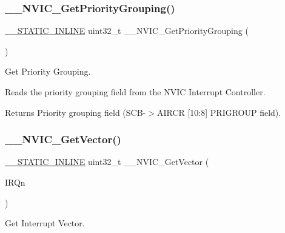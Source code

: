 \subsubsection{\texorpdfstring{\+\_\+\+\_\+\+N\+V\+I\+C\+\_\+\+Get\+Priority\+Grouping()}{\_\_NVIC\_GetPriorityGrouping()}}
{\footnotesize\ttfamily \mbox{\hyperlink{cmsis__iccarm_8h_aba87361bfad2ae52cfe2f40c1a1dbf9c}{\+\_\+\+\_\+\+S\+T\+A\+T\+I\+C\+\_\+\+I\+N\+L\+I\+NE}} uint32\+\_\+t \+\_\+\+\_\+\+N\+V\+I\+C\+\_\+\+Get\+Priority\+Grouping (\begin{DoxyParamCaption}\item[{void}]{ }\end{DoxyParamCaption})}



Get Priority Grouping. 

Reads the priority grouping field from the N\+V\+IC Interrupt Controller. \begin{DoxyReturn}{Returns}
Priority grouping field (S\+C\+B-\/$>$A\+I\+R\+CR \mbox{[}10\+:8\mbox{]} P\+R\+I\+G\+R\+O\+UP field). 
\end{DoxyReturn}
\mbox{\label{group___c_m_s_i_s___core___n_v_i_c_functions_ga44b665d2afb708121d9b10c76ff00ee5}} 
\subsubsection{\texorpdfstring{\+\_\+\+\_\+\+N\+V\+I\+C\+\_\+\+Get\+Vector()}{\_\_NVIC\_GetVector()}}
{\footnotesize\ttfamily \mbox{\hyperlink{cmsis__iccarm_8h_aba87361bfad2ae52cfe2f40c1a1dbf9c}{\+\_\+\+\_\+\+S\+T\+A\+T\+I\+C\+\_\+\+I\+N\+L\+I\+NE}} uint32\+\_\+t \+\_\+\+\_\+\+N\+V\+I\+C\+\_\+\+Get\+Vector (\begin{DoxyParamCaption}\item[{\mbox{\hyperlink{group___interrupt__vector__numbers_gac3af4a32370fb28c4ade8bf2add80251}{I\+R\+Qn\+\_\+\+Type}}}]{I\+R\+Qn }\end{DoxyParamCaption})}



Get Interrupt Vector. 

